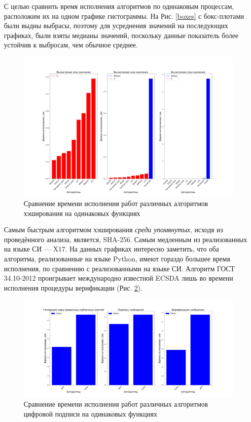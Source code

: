 С целью сравнить время исполнения алгоритмов по одинаковым процессам,
расположим их на одном графике гистограммы.  На Рис. \ref{boxes} с бокс-плотами
были выдны выбрасы, поэтому для усреднения значений на последующих графиках,
были взяты медианы значений, поскольку данные показатель более устойчив к
выбросам, чем обычное среднее.

\begin{figure}[h!]
    \centering
    \includegraphics[width=\textwidth]{./images/hash_comparison}
    \caption{Сравнение времени исполнения работ различных алгоритмов хэширования на одинаковых функциях}\label{hash_comp}
\end{figure}

Самым быстрым алгоритмом хэширования \emph{среди упомянутых}, исходя из
проведённого анализа, является, SHA-256. Самым медленным из реализованных на
языке СИ --- X17.  На данных графиках интересно заметить, что оба алгоритма,
реализованные на языке Python, имеют гораздо большее время исполнения, по
сравнению с реализованными на языке СИ. Алгоритм ГОСТ 34.10-2012 проигрывает
международно известной ECSDA лишь во времени исполнения процедуры
верификации (Рис. \ref{dss_comp}).

\begin{figure}[h!]
    \centering
    \includegraphics[width=1.\textwidth]{./images/dss_comparison}
    \caption{Сравнение времени исполнения работ различных алгоритмов цифровой подписи на одинаковых функциях}\label{dss_comp}
\end{figure}

